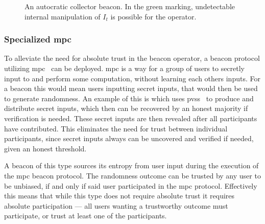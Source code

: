 \begin{figure}[hbt]
    \centering
    \footnotesize
    \caption{An autocratic collector beacon. In the green marking, undetectable internal manipulation of $I_t$ is possible for the operator.}\label{fig:autocratic_beacon}
\end{figure}

\subsubsection{Specialized \gls{mpc}}\label{ssub:specialized_mpc}
To alleviate the need for absolute trust in the beacon operator, a beacon protocol utilizing \acrfull{mpc}~\cite{goldreich1998secure} can be deployed. \gls{mpc} is a way for a group of users to secretly input to and perform some computation, without learning each others inputs.
For a beacon this would mean users inputting secret inputs, that would then be used to generate randomness.
An example of this is  which uses \gls{pvss}~\cite{stadler1996publicly} to produce and distribute secret inputs, which then can be recovered by an honest majority if verification is needed.
These secret inputs are then revealed after all participants have contributed.
This eliminates the need for trust between individual participants, since secret inputs always can be uncovered and verified if needed, given an honest threshold.

A beacon of this type sources its entropy from user input during the execution of the \gls{mpc} beacon protocol.
The randomness outcome can be trusted by any user to be unbiased, if and only if said user participated in the \gls{mpc} protocol.
Effectively this means that while this type does not require absolute trust it requires absolute participation --- all users wanting a trustworthy outcome must participate, or trust at least one of the participants.



